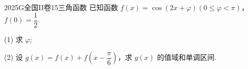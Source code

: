 
\begin{problem}{2025}{G}{全国II卷}{15}{三角函数}
已知函数 $f(x)=\cos(2x+\varphi) (0 \leqslant \varphi < \pi)$，$f(0)=\dfrac{1}{2}$.

(1) 求 $\varphi$;

(2) 设 $g(x)=f(x)+f\left(x-\dfrac{\pi}{6}\right)$，求 $g(x)$ 的值域和单调区间.
\end{problem}